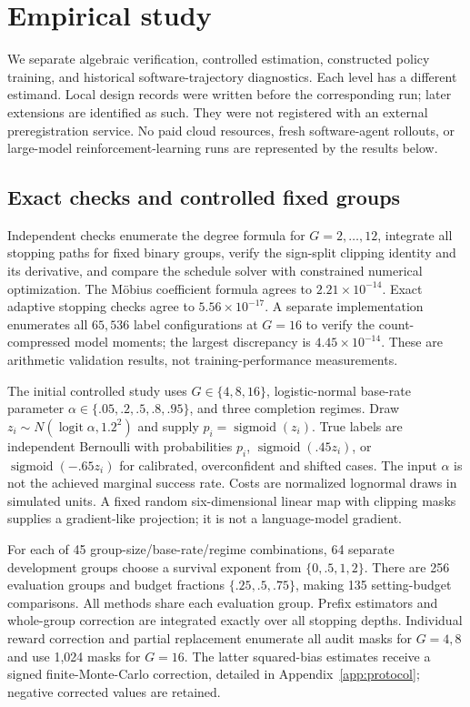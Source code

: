 \documentclass[11pt]{article}
\begin{document}
\section{Empirical study}\label{sec:experiments}
We separate algebraic verification, controlled estimation, constructed policy training, and historical software-trajectory diagnostics. Each level has a different estimand. Local design records were written before the corresponding run; later extensions are identified as such. They were not registered with an external preregistration service. No paid cloud resources, fresh software-agent rollouts, or large-model reinforcement-learning runs are represented by the results below.

\subsection{Exact checks and controlled fixed groups}\label{sec:controlled}
Independent checks enumerate the degree formula for $G=2,\ldots,12$, integrate all stopping paths for fixed binary groups, verify the sign-split clipping identity and its derivative, and compare the schedule solver with constrained numerical optimization. The M\"obius coefficient formula agrees to $2.21\times10^{-14}$. Exact adaptive stopping checks agree to $5.56\times10^{-17}$. A separate implementation enumerates all $65{,}536$ label configurations at $G=16$ to verify the count-compressed model moments; the largest discrepancy is $4.45\times10^{-14}$. These are arithmetic validation results, not training-performance measurements.

The initial controlled study uses $G\in\{4,8,16\}$, logistic-normal base-rate parameter $\alpha\in\{.05,.2,.5,.8,.95\}$, and three completion regimes. Draw $z_i\sim N(\operatorname{logit}\alpha,1.2^2)$ and supply $p_i=\operatorname{sigmoid}(z_i)$. True labels are independent Bernoulli with probabilities $p_i$, $\operatorname{sigmoid}(.45z_i)$, or $\operatorname{sigmoid}(-.65z_i)$ for calibrated, overconfident and shifted cases. The input $\alpha$ is not the achieved marginal success rate. Costs are normalized lognormal draws in simulated units. A fixed random six-dimensional linear map with clipping masks supplies a gradient-like projection; it is not a language-model gradient.

For each of 45 group-size/base-rate/regime combinations, 64 separate development groups choose a survival exponent from $\{0,.5,1,2\}$. There are 256 evaluation groups and budget fractions $\{.25,.5,.75\}$, making 135 setting-budget comparisons. All methods share each evaluation group. Prefix estimators and whole-group correction are integrated exactly over all stopping depths. Individual reward correction and partial replacement enumerate all audit masks for $G=4,8$ and use 1,024 masks for $G=16$. The latter squared-bias estimates receive a signed finite-Monte-Carlo correction, detailed in Appendix~\ref{app:protocol}; negative corrected values are retained.
\end{document}
